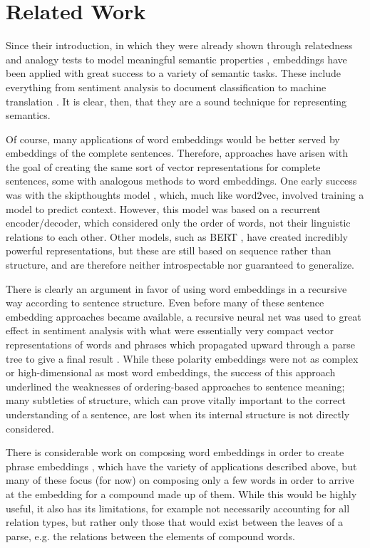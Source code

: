 \documentclass[11pt]{article}
\begin{document}
\section{Related Work}

Since their introduction, in which they were already shown through relatedness and analogy tests to model meaningful semantic properties \cite{mikolov2013}, embeddings have been applied with great success to a variety of semantic tasks. These include everything from sentiment analysis \cite{tang2014} to document classification \cite{kutuzov2016} to machine translation \cite{mi2016}. It is clear, then, that they are a sound technique for representing semantics.

Of course, many applications of word embeddings would be better served by embeddings of the complete sentences. Therefore, approaches have arisen with the goal of creating the same sort of vector representations for complete sentences, some with analogous methods to word embeddings. One early success was with the skipthoughts model \cite{kiros2015}, which, much like word2vec, involved training a model to predict context. However, this model was based on a recurrent encoder/decoder, which considered only the order of words, not their linguistic relations to each other. Other models, such as BERT \cite{devlin2018}, have created incredibly powerful representations, but these are still based on sequence rather than structure, and are therefore neither introspectable nor guaranteed to generalize.

There is clearly an argument in favor of using word embeddings in a recursive way according to sentence structure. Even before many of these sentence embedding approaches became available, a recursive neural net was used to great effect in sentiment analysis with what were essentially very compact vector representations of words and phrases which propagated upward through a parse tree to give a final result \cite{socher2013}. While these polarity embeddings were not as complex or high-dimensional as most word embeddings, the success of this approach underlined the weaknesses of ordering-based approaches to sentence meaning; many subtleties of structure, which can prove vitally important to the correct understanding of a sentence, are lost when its internal structure is not directly considered.

There is considerable work on composing word embeddings in order to create phrase embeddings \cite{dima2015, tai2015, de-kok-pp}, which have the variety of applications described above, but many of these focus (for now) on composing only a few words in order to arrive at the embedding for a compound made up of them. While this would be highly useful, it also has its limitations, for example not necessarily accounting for all relation types, but rather only those that would exist between the leaves of a parse, e.g. the relations between the elements of compound words.
\end{document}
